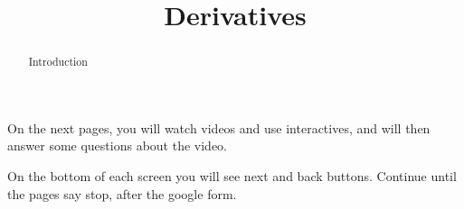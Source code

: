 \documentclass[handout]{ximera}
\title{Derivatives}
\begin{document}
\begin{abstract} Introduction %
\end{abstract}


\maketitle

On the next pages, you will watch videos and use interactives, and will then answer some questions about the video.

On the bottom of each screen you will see next and back buttons. Continue until the pages say stop, after the google form.
\end{document}
